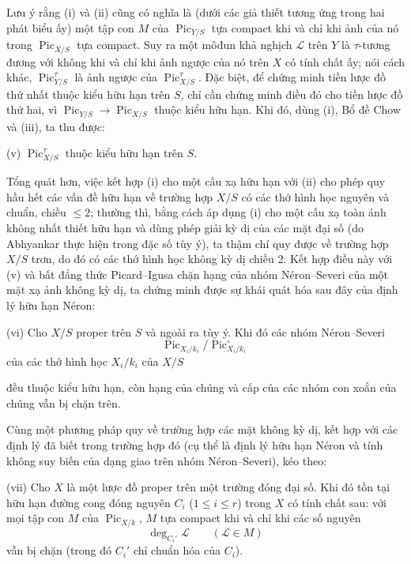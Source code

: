 \documentclass[11pt,twoside,openany]{book}
\numberwithin{equation}{section}
\newcommand{\src}[1]{%
  \phantomsection\hypertarget{src:\fgasourceid:#1}{}%
  \marginpar{\raggedleft\footnotesize\sffamily #1}%
}
\newcommand{\fgasourceid}{unset}
\begin{document}
Lưu ý rằng (i) và (ii) cũng có nghĩa là (dưới các giả thiết tương ứng trong
hai phát biểu ấy) một tập con $M$ của $\operatorname{Pic}_{Y/S}$ tựa compact
khi và chỉ khi ảnh của nó trong $\operatorname{Pic}_{X/S}$ tựa compact. Suy
ra một môđun khả nghịch $\mathcal L$ trên $Y$ là $\tau$-tương đương với không
khi và chỉ khi ảnh ngược của nó trên $X$ có tính chất ấy; nói cách khác,
$\operatorname{Pic}_{Y/S}^\tau$ là ảnh ngược của
$\operatorname{Pic}_{X/S}^\tau$. Đặc biệt, để chứng minh tiền lược đồ thứ
nhất thuộc kiểu hữu hạn trên $S$, chỉ cần chứng minh điều đó cho tiền lược đồ
thứ hai, vì $\operatorname{Pic}_{Y/S}\longrightarrow
\operatorname{Pic}_{X/S}$ thuộc kiểu hữu hạn. Khi đó, dùng (i), Bổ đề Chow và
(iii), ta thu được:

\medskip
\noindent(v) $\operatorname{Pic}_{X/S}^\tau$ thuộc kiểu hữu hạn trên $S$.

Tổng quát hơn, việc kết hợp (i) cho một cấu xạ hữu hạn với (ii) cho phép quy
hầu hết các vấn đề hữu hạn về trường hợp $X/S$ có các thớ hình học nguyên và
chuẩn, chiều $\leq2$; thường thì, bằng cách áp dụng (i) cho một cấu xạ toàn
ánh không nhất thiết hữu hạn và dùng phép giải kỳ dị của các mặt đại số (do
Abhyankar thực hiện trong đặc số tùy ý), ta thậm chí quy được về trường hợp
$X/S$ trơn, do đó có các thớ hình học không kỳ dị chiều 2. Kết hợp điều này
với (v) và bất đẳng thức Picard--Igusa chặn hạng của nhóm Néron--Severi của
một mặt xạ ảnh không kỳ dị, ta chứng minh được sự khái quát hóa sau đây của
định lý hữu hạn Néron:

\medskip
\noindent(vi) Cho $X/S$ proper trên $S$ và ngoài ra tùy ý. Khi đó các nhóm
Néron--Severi
\[
\operatorname{Pic}_{X_i/k_i}/\operatorname{Pic}_{X_i/k_i}^\circ
\]
của các thớ hình học $X_i/k_i$ của $X/S$

\src{305}
đều thuộc kiểu hữu hạn, còn hạng của chúng và cấp của các nhóm con xoắn của
chúng vẫn bị chặn trên.

Cùng một phương pháp quy về trường hợp các mặt không kỳ dị, kết hợp với các
định lý đã biết trong trường hợp đó (cụ thể là định lý hữu hạn Néron và tính
không suy biến của dạng giao trên nhóm Néron--Severi), kéo theo:

\medskip
\noindent(vii) Cho $X$ là một lược đồ proper trên một trường đóng đại số. Khi
đó tồn tại hữu hạn đường cong đóng nguyên $C_i$ ($1\leq i\leq r$) trong $X$
có tính chất sau: với mọi tập con $M$ của $\operatorname{Pic}_{X/k}$, $M$ tựa
compact khi và chỉ khi các số nguyên
\[
\deg_{C_i'}\mathcal L\qquad(\mathcal L\in M)
\]
vẫn bị chặn (trong đó $C_i'$ chỉ chuẩn hóa của $C_i$).
\end{document}
